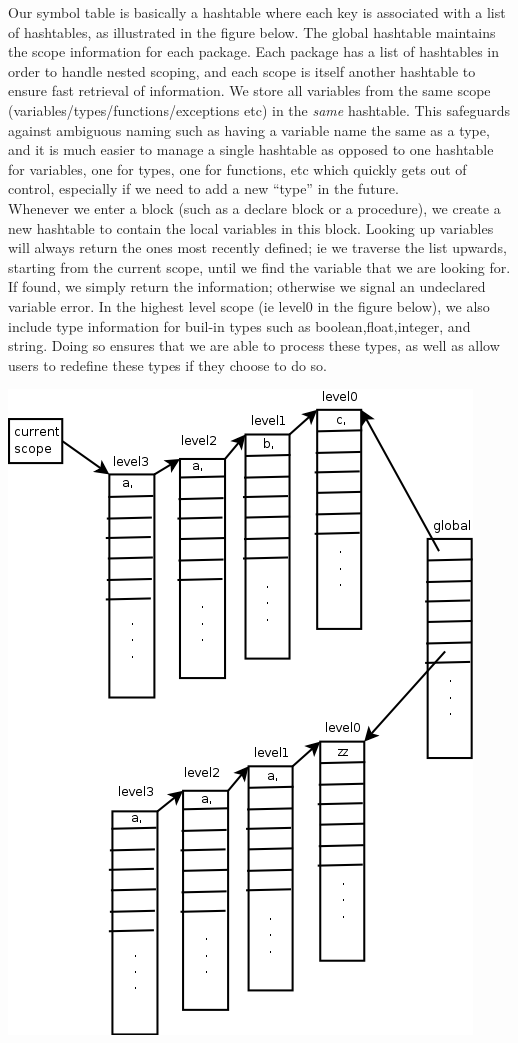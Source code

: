 \documentclass[onecolumn,11pt]{article}
\begin{document}
Our symbol table is basically a hashtable where each key is associated with a list of hashtables, as illustrated in the figure below. The global hashtable maintains the scope information for each package. Each package has a list of hashtables in order to handle nested scoping, and each scope is itself another hashtable to ensure fast retrieval of information. We store all variables from the same scope (variables/types/functions/exceptions etc) in the \emph{same} hashtable. This safeguards against ambiguous naming such as having a variable name the same as a type, and it is much easier to manage a single hashtable as opposed to one hashtable for variables, one for types, one for functions, etc which quickly gets out of control, especially if we need to add a new ``type'' in the future. \\

Whenever we enter a block (such as a declare block or a procedure), we create a new hashtable to contain the local variables in this block. Looking up variables will always return the ones most recently defined; ie we traverse the list upwards, starting from the current scope, until we find the variable that we are looking for. If found, we simply return the information; otherwise we signal an undeclared variable error. In the highest level scope (ie level0 in the figure below), we also include type information for buil-in types such as boolean,float,integer, and string. Doing so ensures that we are able to process these types, as well as allow users to redefine these types if they choose to do so.

\includegraphics[scale=0.3]{symbol_table.png}
\end{document}
